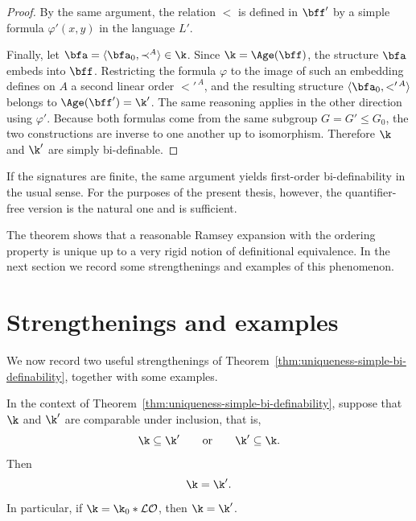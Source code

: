 \begin{proof}
    By the same argument, the relation $<$ is defined in $\bff'$ by a simple
    formula \(\varphi'(x,y)\) in the language $L'$.

    Finally, let \(\bfa=\langle \bfa_0,\prec^A\rangle\in\k\).
    Since $\k=\Age(\bff)$, the structure $\bfa$ embeds into $\bff$. Restricting the formula $\varphi$ to the image of such an embedding defines on $A$ a second linear order $<'^{\,A}$, and the resulting structure
    \(\langle \bfa_0,<'^{\,A}\rangle\)
    belongs to $\Age(\bff')=\k'$. The same reasoning applies in the other direction using $\varphi'$. Because both formulas come from the same subgroup
    \(G=G'\leq G_0\),
    the two constructions are inverse to one another up to isomorphism. Therefore $\k$ and $\k'$ are simply bi-definable.
\end{proof}

\begin{remark}
    If the signatures are finite, the same argument yields first-order bi-definability in the usual sense. For the purposes of the present thesis, however, the quantifier-free version is the natural one and is sufficient.
\end{remark}

The theorem shows that a reasonable Ramsey expansion with the ordering property is unique up to a very rigid notion of definitional equivalence. In the next section we record some strengthenings and examples of this phenomenon.

\section{Strengthenings and examples}

We now record two useful strengthenings of Theorem~\ref{thm:uniqueness-simple-bi-definability}, together with some examples.

\begin{proposition}
    \label{prop:comparable-expansions-equal}
    In the context of Theorem~\ref{thm:uniqueness-simple-bi-definability}, suppose that $\k$ and $\k'$ are comparable under inclusion, that is,
    \[
        \k\subseteq \k'
        \qquad\text{or}\qquad
        \k'\subseteq \k.
    \]
    Then
    \[
        \k=\k'.
    \]
    In particular, if \(\k=\k_0*\mathcal{LO}\),
    then $\k=\k'$.
\end{proposition}


